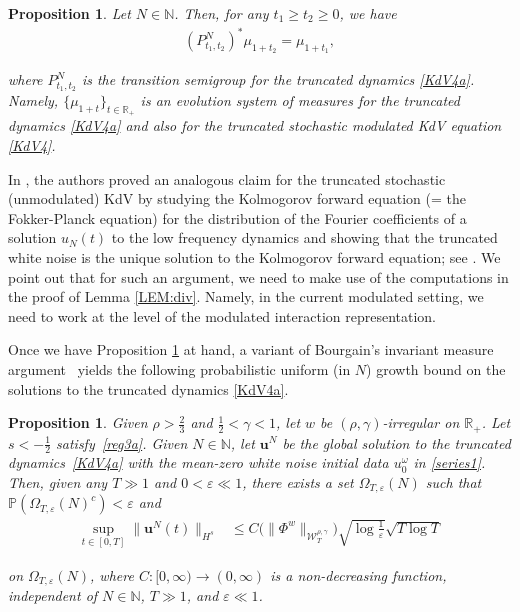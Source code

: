 \documentclass[letterpaper, 11pt,  reqno]{amsart}
\newtheorem{proposition}[theorem]{Proposition}
\newcommand{\1}{\hspace{0.5mm}\text{I}\hspace{0.5mm}}
\newcommand{\noi}{\noindent}
\newcommand{\R}{\mathbb{R}}
\newcommand{\NB}{\mathbb{N}}
\newcommand{\eps}{\varepsilon}
\newcommand{\g}{\gamma}
\renewcommand{\o}{\omega}
\newcommand{\W}{\mathcal{W}}
\newcommand{\uu}{\mathbf{u}}
\numberwithin{equation}{section}
\numberwithin{theorem}{section}
\begin{document}
\begin{proposition}\label{PROP:finite}
Let $N \in \NB$. 
Then, for any $t_1 \ge t_2 \ge 0$, we have 
\begin{align*}
(P^{N}_{t_1, t_2})^* \mu_{1+t_2}
=   \mu_{1+t_1 }, 
\end{align*}

\noi
where 
  $P^{N}_{t_1, t_2}$
is  the transition semigroup for the truncated dynamics \eqref{KdV4a}.
Namely, $\{\mu_{1+t}\}_{t \in \R_+}$
is an evolution system of measures
for the truncated dynamics \eqref{KdV4a}
and also for the truncated
stochastic modulated KdV equation \eqref{KdV4}.
\end{proposition}



In \cite{OQS}, 
the authors proved an analogous claim
for the truncated stochastic (unmodulated) KdV 
by studying 
 the  Kolmogorov forward equation 
(= the Fokker-Planck equation)
 for the distribution 
 of the Fourier coefficients
 of a solution $u_N(t)$ to the low frequency dynamics
 and showing that the truncated white noise
 is the unique  solution to the 
  Kolmogorov forward equation;
 see \cite[Section 2]{OQS}.
We point out that for such an argument, 
we need to make use of the computations in the proof of Lemma \ref{LEM:div}.
Namely, in the current modulated setting, 
we need to work at the level of the modulated interaction representation.








Once we have
Proposition \ref{PROP:finite} at hand, 
 a variant of 
 Bourgain's invariant measure argument~\cite{BO94}
 yields
 the following 
probabilistic  uniform (in $N$) growth bound 
on the solutions to the truncated dynamics \eqref{KdV4a}.


 
\begin{proposition}\label{PROP:main1}
Given $\rho>\frac23$ and $\frac12<\g<1$,  let $w$ be
$(\rho,\g)$-irregular on $\R_+$.
Let $s<-\frac12$ satisfy~\eqref{reg3a}.
Given $N \in \NB$, let $\uu^N$ be the global solution to the truncated dynamics~\eqref{KdV4a}
with the mean-zero white noise initial data $u_0^\o$ in \eqref{series1}.
Then, 
given any  $T\gg1$ and $0 < \eps\ll 1$, there exists a set  $\Omega_{T,\eps}(N)$ such that 
$\mathbb{P}(\Omega_{T,\eps}(N)^c)<\eps$ and
  \begin{align}
    \sup_{t\in [0,T]}\|\uu^N(t)\|_{H^s}&\le  C\big( \| \Phi^w \|_{\W_T^{\rho,\g}} \big)
 \sqrt {\log \frac 1 \eps}\sqrt{T \log T}
\label{growth1}
  \end{align}

\noi
on $\Omega_{T,\eps}(N)$, 
where $C:[0,\infty)\to(0,\infty)$ is a non-decreasing function, 
independent of $N \in \NB$, $T\gg1$, and $\eps \ll 1$.


\end{proposition}
\end{document}
